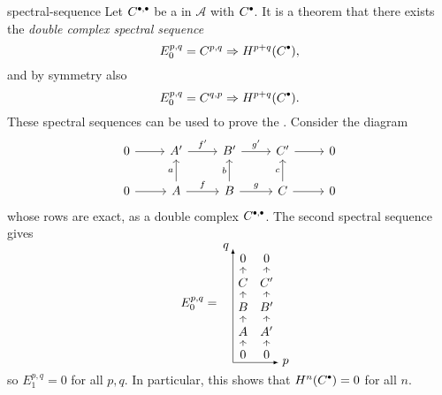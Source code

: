 \begin{example}{spectral-sequence}
    Let $C^{\bdot, \bdot}$ be a  in $\mathcal{A}$ with  $C^\bdot$. It is a theorem that there exists the \textit{double complex spectral sequence}
    \[ E_0^{p, q} = C^{p, q} \Rightarrow H^{p + q}(C^\bdot) , \]
    and by symmetry also
    \[ E_0^{p, q} = C^{q, p} \Rightarrow H^{p + q}(C^\bdot) . \]
    These spectral sequences can be used to prove the . Consider the diagram
    \[ \begin{tikzcd}
        0 \arrow{r} & A' \arrow{r}{f'} & B' \arrow{r}{g'} & C' \arrow{r} & 0 \\
        0 \arrow{r} & A \arrow{r}{f} \arrow{u}{a} & B \arrow{r}{g} \arrow{u}{b} & C \arrow{r} \arrow{u}{c} & 0
    \end{tikzcd} \]
    whose rows are exact, as a double complex $C^{\bdot, \bdot}$. The second spectral sequence gives
    \[ E_0^{p, q} = \quad \begin{tikzcd}[row sep=0.5em, column sep=0.1em]
        0 & 0 \\
        C \arrow{u} & C' \arrow{u} \\
        B \arrow{u} & B' \arrow{u} \\
        A \arrow{u} & A' \arrow{u} \\
        0 \arrow{u} & 0 \arrow{u}
    \end{tikzcd} \begin{tikzpicture}[overlay,remember picture]
        \draw[-latex] (-1.3, -1.6) -- (-1.3, 1.65);
        \draw[-latex] (-1.3, -1.6) -- (0, -1.6);
        \node at (0.2, -1.6) {$p$};
        \node at (-1.5, 1.7) {$q$};
    \end{tikzpicture} \]
    so $E_1^{p, q} = 0$ for all $p, q$. In particular, this shows that $H^n(C^\bdot) = 0$ for all $n$.
    

\end{example}
